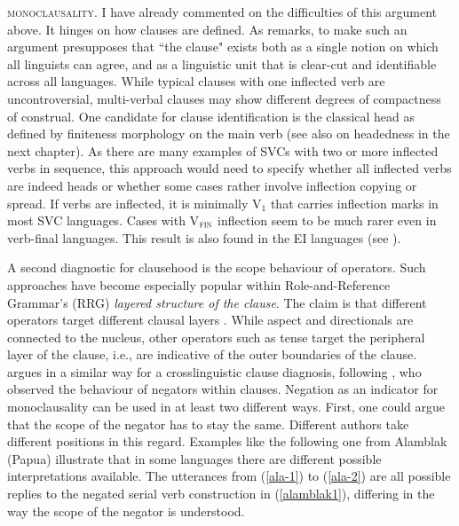 \textsc{monoclausality}. I have already commented on the difficulties of this argument above. It hinges on how clauses are defined. As \citet[26]{lane2008kalam} remarks, to make such an argument presupposes that ``the clause" exists both as a single notion on which all linguists can agree, and as a linguistic unit that is clear-cut and identifiable across all languages. While typical clauses with one inflected verb are uncontroversial, multi-verbal clauses may show different degrees of compactness of construal. One candidate for clause identification is the classical head as defined by finiteness morphology on the main verb (see also  on headedness in the next chapter). As there are many examples of SVCs with two or more inflected verbs in sequence, this approach would need to specify whether all inflected verbs are indeed heads or whether some cases rather involve inflection copying or spread. If verbs are inflected, it is minimally V$_1$ that carries inflection marks in most SVC languages. Cases with V$_{\textsc{fin}}$ inflection seem to be much rarer even in verb-final languages. This result is also found in the EI languages (see ).


A second diagnostic for clausehood is the scope behaviour of operators. Such approaches have become especially popular within Role-and-Reference Grammar's (RRG) \textit{layered structure of the clause}. The claim is that different operators target different clausal layers \citep{foley1984functional}. While aspect and directionals are connected to the nucleus, other operators such as tense target the peripheral layer of the clause, i.e., are indicative of the outer boundaries of the clause. \citet{haspelmath2016serial} argues in a similar way for a crosslinguistic clause diagnosis, following \citet{bohnemeyer2007principles}, who observed the behaviour of negators within clauses. Negation as an indicator for monoclausality can be used in at least two different ways. First, one could argue that the scope of the negator has to stay the same. Different authors take different positions in this regard. Examples like the following one from Alamblak (Papua) illustrate that in some languages there are different possible interpretations available. The utterances from (\ref{ala-1}) to (\ref{ala-2}) are all possible replies to the negated serial verb construction in (\ref{alamblak1}), differing in the way the scope of the negator is understood.
\newpage


